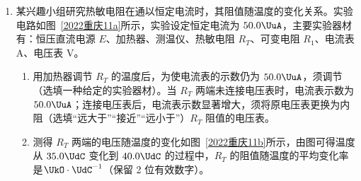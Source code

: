 \documentclass[\gkver]{gaokaozhenti}
\begin{document}
\begin{enumerate}
{$mg\sin 45^\circ - F - f = ma_{2}$

解得

$a_{2} = \frac{\sqrt 2}{2}g - 2\mu g\cos 45^\circ = \frac{\sqrt 2}{6}g$

则拉力分别沿斜面向上和向下时，物块的加速度大小之比为

$\frac{a_{2}}{a_{1}} = \frac{1}{3}$

故 C 正确；

B．当拉力沿斜面向上，重力做功为

$W_{\text{G2}} = mg\sin 45^\circ \cdot x$

合力做功为

$W_{\text{合}} = ma_{2} \cdot x$

则其比值为

$\frac{W_{\text{G2}}}{W_{\text{合}}} = \frac{\frac{\sqrt 2}{2}g}{\frac{\sqrt 2}{6}g} = \frac{3}{1}$

则重力做功为 $9\UJ$ 时，物块的动能即合外力做功为 $3\UJ$，故 C 正确；

D．当拉力分别沿斜面向上和向下时，物块滑到底端时的动量大小为

$P = mv = m\sqrt{2ax}$

则动量的大小之比为

$\frac{P_{2}}{P_{1}} = \frac{\sqrt{a_{2}}}{\sqrt{a_{1}}} = \frac{1}{\sqrt 3}$

故 D 错误。

故选 BC。
}

\item
某兴趣小组研究热敏电阻在通以恒定电流时，其阻值随温度的变化关系。实验电路如图~\ref{2022重庆11a}所示，实验设定恒定电流为 $50.0\UuA$，主要实验器材有：恒压直流电源 $E$、加热器、测温仪、热敏电阻 $R_{T}$、可变电阻 $R_{1}$、电流表 A、电压表 V。
\begin{enumerate}
	\item
	用加热器调节 $R_{T}$ 的温度后，为使电流表的示数仍为 $50.0\UuA$，须调节（选填一种给定的实验器材）。当 $R_{T}$ 两端未连接电压表时，电流表示数为 $50.0\UuA$；连接电压表后，电流表示数显著增大，须将原电压表更换为内阻（选填“远大于”“接近”“远小于”）$R_{T}$ 阻值的电压表。
	\item
	测得 $R_{T}$ 两端的电压随温度的变化如图~\ref{2022重庆11b}所示，由图可得温度从 $35.0\UdC$ 变化到 $40.0\UdC$ 的过程中，$R_{T}$ 的阻值随温度的平均变化率是$\UkO \cdot \UdC^{-1}$（保留 2 位有效数字）。
\end{enumerate}


\end{enumerate}
\end{document}
